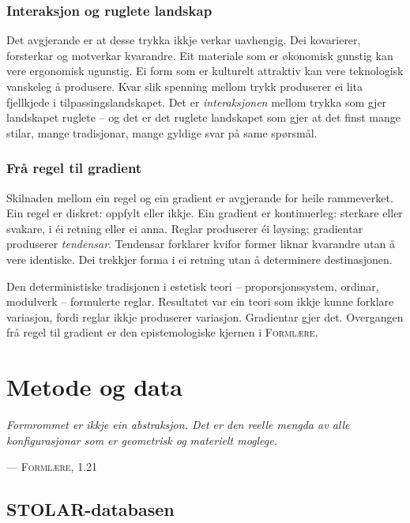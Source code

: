 \documentclass[12pt,a4paper,oneside]{report}
\begin{document}
\subsection{Interaksjon og ruglete landskap}

Det avgjerande er at desse trykka ikkje verkar uavhengig. Dei kovarierer, forsterkar og motverkar kvarandre. Eit materiale som er økonomisk gunstig kan vere ergonomisk ugunstig. Ei form som er kulturelt attraktiv kan vere teknologisk vanskeleg å produsere. Kvar slik spenning mellom trykk produserer ei lita fjellkjede i tilpassingslandskapet. Det er \emph{interaksjonen} mellom trykka som gjer landskapet ruglete -- og det er det ruglete landskapet som gjer at det finst mange stilar, mange tradisjonar, mange gyldige svar på same spørsmål.

\subsection{Frå regel til gradient}

Skilnaden mellom ein regel og ein gradient er avgjerande for heile rammeverket. Ein regel er diskret: oppfylt eller ikkje. Ein gradient er kontinuerleg: sterkare eller svakare, i éi retning eller ei anna. Reglar produserer éi løysing; gradientar produserer \emph{tendensar}. Tendensar forklarer kvifor former liknar kvarandre utan å vere identiske. Dei trekkjer forma i ei retning utan å determinere destinasjonen.

Den deterministiske tradisjonen i estetisk teori -- proporsjonssystem, ordinar, modulverk -- formulerte reglar. Resultatet var ein teori som ikkje kunne forklare variasjon, fordi reglar ikkje produserer variasjon. Gradientar gjer det. Overgangen frå regel til gradient er den epistemologiske kjernen i \textsc{Formlære}.

\chapter{Metode og data}
\label{ch:metode}

\epigraph{\itshape Formrommet er ikkje ein abstraksjon. Det er den reelle mengda av alle konfigurasjonar som er geometrisk og materielt moglege.}{--- \textsc{Formlære}, 1.21}

\section{STOLAR-databasen}
\end{document}
